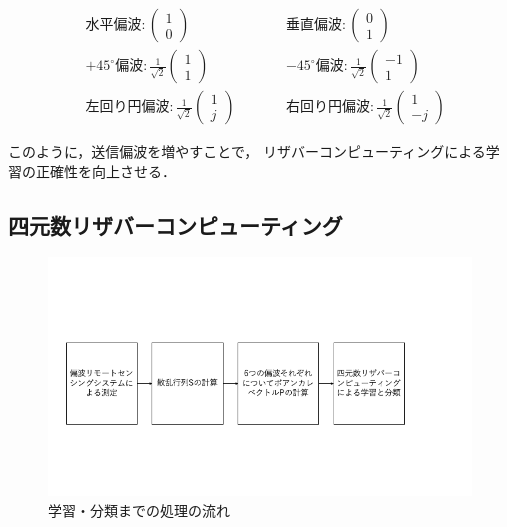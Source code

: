 \documentclass[uplatex,a4paper]{jsarticle}
\begin{document}
\begin{align*}
    &水平偏波: \left(
        \begin{array}{c}
            1 \\
            0
        \end{array}
        \right) \qquad
    &&垂直偏波: \left(
        \begin{array}{c}
            0 \\
            1
        \end{array}
        \right)\\
    &+45^\circ 偏波: \frac{1}{\sqrt{2}}\left(
        \begin{array}{c}
            1 \\
            1
        \end{array}
        \right) \qquad
    &&-45^\circ 偏波: \frac{1}{\sqrt{2}}\left(
        \begin{array}{c}
            -1 \\
            1
        \end{array}
    \right)\\
    &左回り円偏波: \frac{1}{\sqrt{2}}\left(
        \begin{array}{c}
            1 \\
            j
        \end{array}
        \right) \qquad
    &&右回り円偏波: \frac{1}{\sqrt{2}}\left(
        \begin{array}{c}
            1 \\
            -j
        \end{array}
        \right)
\end{align*}

このように，送信偏波を増やすことで，
リザバーコンピューティングによる学習の正確性を向上させる．

\subsection{四元数リザバーコンピューティング}
\begin{figure}[hbtp]
	\centering
	\includegraphics[scale=0.4]{../img/process.png}
    \caption{学習・分類までの処理の流れ}
	\label{fig:process}
\end{figure}
\end{document}
